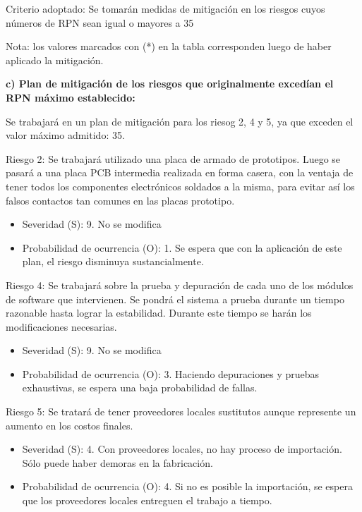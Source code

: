 Criterio adoptado: 
Se tomarán medidas de mitigación en los riesgos cuyos números de RPN sean igual o mayores a 35

Nota: los valores marcados con (*) en la tabla corresponden luego de haber aplicado la mitigación.

\textbf{c) Plan de mitigación de los riesgos que originalmente excedían el RPN máximo establecido:}
 
 Se trabajará en un plan de mitigación para los riesog 2, 4 y 5, ya que exceden el valor máximo admitido: 35.
 
Riesgo 2: Se trabajará utilizado una placa de armado de prototipos. Luego se pasará a una placa PCB intermedia realizada en forma casera, con la ventaja de tener todos los componentes electrónicos soldados a la misma, para evitar así los falsos contactos tan comunes en las placas prototipo.
\begin{itemize}
\item Severidad (S): 9. No se modifica
\item Probabilidad de ocurrencia (O): 1. Se espera que con la aplicación de este plan, el riesgo disminuya sustancialmente.
\end{itemize}

Riesgo 4: Se trabajará sobre la prueba y depuración de cada uno de los módulos de software que intervienen. Se pondrá el sistema a prueba durante un tiempo razonable hasta lograr la estabilidad. Durante este tiempo se harán los modificaciones necesarias.
\begin{itemize}
\item Severidad (S): 9. No se modifica
\item Probabilidad de ocurrencia (O): 3. Haciendo depuraciones y pruebas exhaustivas, se espera una baja probabilidad de fallas.
\end{itemize}

Riesgo 5:  Se tratará de tener  proveedores locales sustitutos aunque represente un aumento en los costos finales. 
\begin{itemize}
\item Severidad (S): 4. Con proveedores locales, no hay proceso de importación. Sólo puede haber demoras en la fabricación.
\item Probabilidad de ocurrencia (O): 4. Si no es posible la importación, se espera que los proveedores locales entreguen el trabajo a tiempo.
\end{itemize}